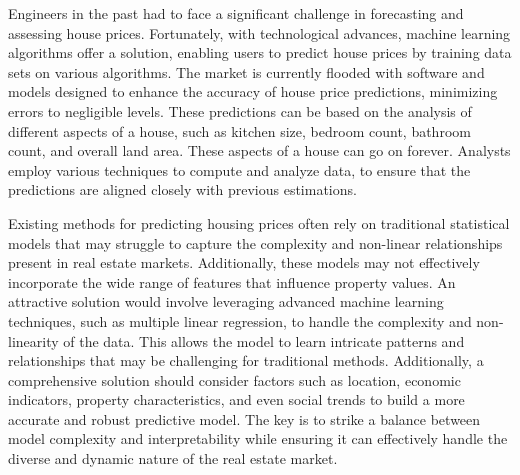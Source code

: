 \documentclass[12pt]{article}
\begin{document}
Engineers in the past had to face a significant challenge in forecasting and assessing house prices. Fortunately, with technological advances, machine learning algorithms offer a solution, enabling users to predict house prices by training data sets on various algorithms. The market is currently flooded with software and models designed to enhance the accuracy of house price predictions, minimizing errors to negligible levels. These predictions can be based on the analysis of different aspects of a house, such as kitchen size, bedroom count, bathroom count, and overall land area. These aspects of a house can go on forever. Analysts employ various techniques to compute and analyze data,  to ensure that the predictions are aligned closely with previous estimations. \cite{singh2021}

Existing methods for predicting housing prices often rely on traditional statistical models that may struggle to capture the complexity and non-linear relationships present in real estate markets. Additionally, these models may not effectively incorporate the wide range of features that influence property values. An attractive solution would involve leveraging advanced machine learning techniques, such as multiple linear regression, to handle the complexity and non-linearity of the data. This allows the model to learn intricate patterns and relationships that may be challenging for traditional methods. Additionally, a comprehensive solution should consider factors such as location, economic indicators, property characteristics, and even social trends to build a more accurate and robust predictive model. The key is to strike a balance between model complexity and interpretability while ensuring it can effectively handle the diverse and dynamic nature of the real estate market.
\end{document}
